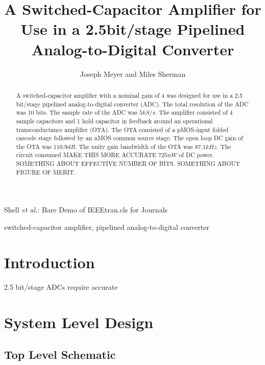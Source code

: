 \documentclass[journal]{IEEEtran}
\begin{document}
\title{A Switched-Capacitor Amplifier for Use in a 2.5bit/stage Pipelined Analog-to-Digital Converter }

\author{Joseph Meyer and Miles Sherman}

%
{Shell \MakeLowercase{\textit{et al.}}: Bare Demo of IEEEtran.cls for Journals}

\maketitle

\begin{abstract}
A switched-capacitor amplifier with a nominal gain of 4 was designed for use in a 2.5 bit/stage pipelined analog-to-digital converter (ADC). The total resolution of the ADC was 10 bits. The sample rate of the ADC was $5kS/s$. The amplifier consisted of 4 sample capacitors and 1 hold capacitor in feedback around an operational transconductance amplifier (OTA). The OTA consisted of a pMOS-input folded cascode stage followed by an nMOS common source stage. The open loop DC gain of the OTA was $110.9dB$. The unity gain bandwidth of the OTA was $87.1kHz$. The circuit consumed MAKE THIS MORE ACCURATE $725nW$ of DC power. SOMETHING ABOUT EFFECTIVE NUMBER OF BITS. SOMETHING ABOUT FIGURE OF MERIT.
\end{abstract}

\begin{IEEEkeywords}
switched-capacitor amplifier, pipelined analog-to-digital converter
\end{IEEEkeywords}

\section{Introduction}
 2.5 bit/stage ADCs require accurate 

\section{System Level Design}
\subsection{Top Level Schematic}
\end{document}
